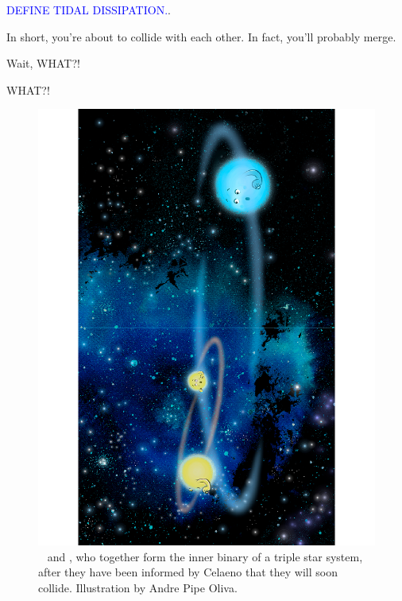 \documentclass[main.tex]{subfiles}
\begin{document}
\begin{tcolorbox}[sharp corners, colback=blue!30, colframe=blue!80!blue, title=Torque]
\par \textcolor{blue}{DEFINE TIDAL DISSIPATION.}.  
\end{tcolorbox}

\par \Celaeno In short, you're about to collide with each other.  In fact, you'll probably merge.

\par \Taygete  Wait, WHAT?!

\par \Alcyone  WHAT?!

\begin{figure}
\includegraphics[width=\columnwidth,angle=270,origin=c]{ch3_1.pdf}
\caption{\rmtaygete~ and \rmalcyone, who together form the inner binary of a triple star system, after they have been informed by Celaeno that they will soon collide.  Illustration by Andre Pipe Oliva.
\label{fig:fig1}}
\end{figure}
\end{document}
